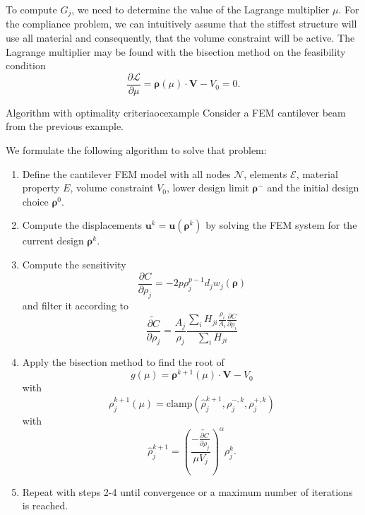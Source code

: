 To compute $G_j$, we need to determine the value of the Lagrange multiplier $\mu$. For the compliance problem, we can intuitively assume that the stiffest structure will use all material and consequently, that the volume constraint will be active. The Lagrange multiplier may be found with the bisection method on the feasibility condition
\begin{equation}
    \frac{\partial \mathcal{L}}{\partial \mu} = \pmb{\rho}(\mu) \cdot \mathbf{V} - V_0 = 0.
\end{equation}

\begin{example}{Algorithm with optimality criteria}{ocexample}
    Consider a FEM cantilever beam from the previous example. 

    We formulate the following algorithm to solve that problem: 
    \begin{enumerate}
        \item Define the cantilever FEM model with all nodes $\mathcal{N}$, elements $\mathcal{E}$, material property $E$, volume constraint $V_0$, lower design limit $\pmb{\rho}^-$ and the initial design choice $\pmb{\rho}^0$.
        \item Compute the displacements $\mathbf{u}^k = \mathbf{u}(\pmb{\rho}^k)$ by solving the FEM system for the current design $\pmb{\rho}^k$.
        \item Compute the sensitivity 
        \begin{equation}
            \frac{\partial C}{\partial \rho_j} = -2 p \rho_j^{p-1} d_j w_j(\pmb{\rho})
        \end{equation}
        and filter it according to
        \begin{equation}
            \widetilde{\frac{\partial C}{\partial \rho_j}} = \frac{A_j}{\rho_j} \frac{\sum_i H_{ji} \frac{\rho_i}{A_i} \frac{\partial C}{\partial \rho_i}}{\sum_i H_{ji}}
        \end{equation}
        \item Apply the bisection method to find the root of 
            \begin{equation}
                g(\mu) = \pmb{\rho}^{k+1}(\mu) \cdot \mathbf{V} - V_0
            \end{equation}
        with 
        \begin{equation}
            \rho^{k+1}_j(\mu) = \textrm{clamp} \left(\hat{\rho}_j^{k+1}, \rho_j^{-,k}, \rho_j^{+,k} \right)
        \end{equation}
        with
        \begin{equation}
            \hat{\rho}_j^{k+1} = \left(\frac{ - \widetilde{\frac{\partial C}{\partial \rho_j}}}{\mu V_j}\right)^\alpha \rho_j^k.
        \end{equation}
        \item Repeat with steps 2-4 until convergence or a maximum number of iterations is reached.
    \end{enumerate}
\end{example}

